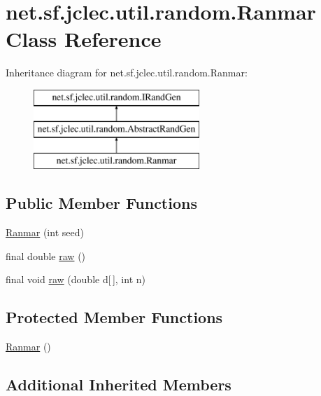 \hypertarget{classnet_1_1sf_1_1jclec_1_1util_1_1random_1_1_ranmar}{\section{net.\-sf.\-jclec.\-util.\-random.\-Ranmar Class Reference}
\label{classnet_1_1sf_1_1jclec_1_1util_1_1random_1_1_ranmar}
}
Inheritance diagram for net.\-sf.\-jclec.\-util.\-random.\-Ranmar\-:\begin{figure}[H]
\begin{center}
\leavevmode
\includegraphics[height=3.000000cm]{classnet_1_1sf_1_1jclec_1_1util_1_1random_1_1_ranmar}
\end{center}
\end{figure}
\subsection*{Public Member Functions}
\begin{DoxyCompactItemize}
\item 
\hyperlink{classnet_1_1sf_1_1jclec_1_1util_1_1random_1_1_ranmar_ab7e3d8c3e5f201860480e51a3bd2e9db}{Ranmar} (int seed)
\item 
final double \hyperlink{classnet_1_1sf_1_1jclec_1_1util_1_1random_1_1_ranmar_a2e6121c577a4fddedfa776fe33125083}{raw} ()
\item 
final void \hyperlink{classnet_1_1sf_1_1jclec_1_1util_1_1random_1_1_ranmar_a68a033084f274508dbf6ad52c0ff2158}{raw} (double d\mbox{[}$\,$\mbox{]}, int n)
\end{DoxyCompactItemize}
\subsection*{Protected Member Functions}
\begin{DoxyCompactItemize}
\item 
\hyperlink{classnet_1_1sf_1_1jclec_1_1util_1_1random_1_1_ranmar_a1af117546d76d350990a852b76ae6391}{Ranmar} ()
\end{DoxyCompactItemize}
\subsection*{Additional Inherited Members}


